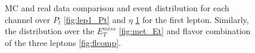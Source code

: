\begin{figure}
{\begin{subfigure}{.525\textwidth}
        \caption{}
        \label{fig:lep1_Eta}
    \end{subfigure}
    }
    \caption{\ac{MC} and real data comparison and event distribution for each channel over $P_t$ \ref{fig:lep1_Pt} and 
    $\eta$ \ref{fig:lep1_Eta} for the first lepton. Similarly, the distribution over the $E_T^{miss}$ \ref{fig:met_Et}
    and flavor combination of the three leptons \ref{fig:flcomp}.}
    \label{fig:Dist1}
\end{figure}